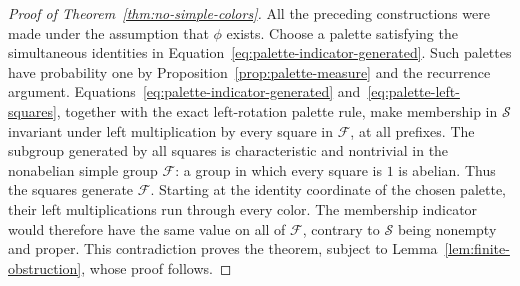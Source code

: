 \begin{proof}[Proof of Theorem~\ref{thm:no-simple-colors}]
All the preceding constructions were made under the assumption that
$\phi$ exists. Choose a palette satisfying the simultaneous identities
in Equation~\ref{eq:palette-indicator-generated}. Such palettes have
probability one by Proposition~\ref{prop:palette-measure} and the
recurrence argument. Equations~\ref{eq:palette-indicator-generated}
and~\ref{eq:palette-left-squares}, together with the exact left-rotation
palette rule, make membership in $\mathcal S$ invariant under left
multiplication by every square in $\mathcal F$, at all prefixes.
The subgroup generated by all squares is characteristic and nontrivial
in the nonabelian simple group $\mathcal F$: a group in which every
square is $1$ is abelian. Thus the squares generate $\mathcal F$.
Starting at the identity coordinate of the chosen palette, their left
multiplications run through every color. The membership indicator would
therefore have the same value on all of $\mathcal F$, contrary to
$\mathcal S$ being nonempty and proper. This contradiction proves the
theorem, subject to Lemma~\ref{lem:finite-obstruction}, whose proof follows.
\end{proof}
